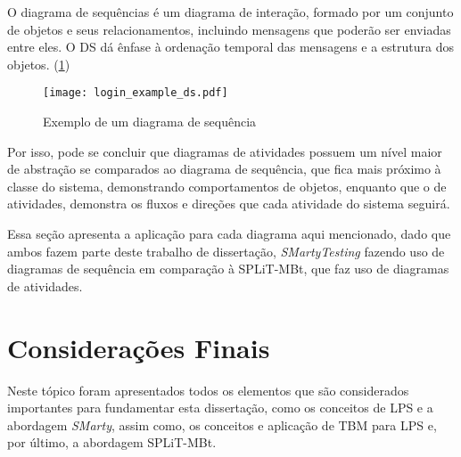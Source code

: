 O diagrama de sequências é um diagrama de interação, formado por um conjunto de objetos e seus relacionamentos, incluindo mensagens que poderão ser enviadas entre eles. O DS dá ênfase à ordenação temporal das mensagens e a estrutura dos objetos. (\ref{fig:DS})

\begin{figure}[h!]
	\centering
	\texttt{[image: login\_example\_ds.pdf]}
	\caption{Exemplo de um diagrama de sequência}
	\label{fig:DS}
\end{figure}


Por isso, pode se concluir que diagramas de atividades possuem um nível maior de abstração se comparados ao diagrama de sequência, que fica mais próximo à classe do sistema, demonstrando comportamentos de objetos, enquanto que o de atividades, demonstra os fluxos e direções que cada atividade do sistema seguirá.

Essa seção apresenta a aplicação para cada diagrama aqui mencionado, dado que ambos fazem parte deste trabalho de dissertação, \textit{SMartyTesting} fazendo uso de diagramas de sequência em comparação à SPLiT-MBt, que faz uso de diagramas de atividades.

\section{Considerações Finais}
Neste tópico foram apresentados todos os elementos que são considerados importantes para fundamentar esta dissertação, como os conceitos de LPS e a abordagem \textit{SMarty}, assim como, os conceitos e aplicação de TBM para LPS e, por último, a abordagem SPLiT-MBt.
